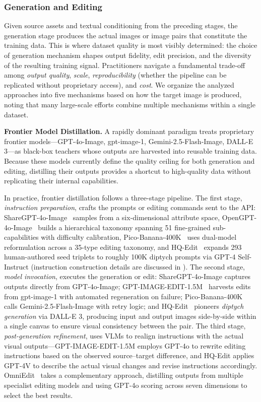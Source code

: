 \subsubsection{Generation and Editing}
\label{sec:generation}

Given source assets and textual conditioning from the preceding stages, the generation stage produces the actual images or image pairs that constitute the training data. This is where dataset quality is most visibly determined: the choice of generation mechanism shapes output fidelity, edit precision, and the diversity of the resulting training signal. Practitioners navigate a fundamental trade-off among \emph{output quality}, \emph{scale}, \emph{reproducibility} (whether the pipeline can be replicated without proprietary access), and \emph{cost}. We organize the analyzed approaches into five mechanisms based on how the target image is produced, noting that many large-scale efforts combine multiple mechanisms within a single dataset.


\textbf{Frontier Model Distillation.}
A rapidly dominant paradigm treats proprietary frontier models---GPT-4o-Image, gpt-image-1, Gemini-2.5-Flash-Image, DALL-E 3---as black-box teachers whose outputs are harvested into reusable training data. Because these models currently define the quality ceiling for both generation and editing, distilling their outputs provides a shortcut to high-quality data without replicating their internal capabilities.

In practice, frontier distillation follows a three-stage pipeline. The first stage, \emph{instruction preparation}, crafts the prompts or editing commands sent to the API: ShareGPT-4o-Image~\citep{chen2025sharegpt} samples from a six-dimensional attribute space, OpenGPT-4o-Image~\citep{chen2025opengpt} builds a hierarchical taxonomy spanning 51 fine-grained sub-capabilities with difficulty calibration, Pico-Banana-400K~\citep{qian2025pico} uses dual-model reformulation across a 35-type editing taxonomy, and HQ-Edit~\citep{hui2024hq} expands 293 human-authored seed triplets to roughly 100K diptych prompts via GPT-4 Self-Instruct (instruction construction details are discussed in ). The second stage, \emph{model invocation}, executes the generation or edit: ShareGPT-4o-Image captures outputs directly from GPT-4o-Image; GPT-IMAGE-EDIT-1.5M~\citep{wang2025gpt} harvests edits from gpt-image-1 with automated regeneration on failure; Pico-Banana-400K calls Gemini-2.5-Flash-Image with retry logic; and HQ-Edit~\citep{hui2024hq} pioneers \emph{diptych generation} via DALL-E 3, producing input and output images side-by-side within a single canvas to ensure visual consistency between the pair. The third stage, \emph{post-generation refinement}, uses VLMs to realign instructions with the actual visual outputs---GPT-IMAGE-EDIT-1.5M employs GPT-4o to rewrite editing instructions based on the observed source--target difference, and HQ-Edit applies GPT-4V to describe the actual visual changes and revise instructions accordingly. OmniEdit~\citep{wei2024omniedit} takes a complementary approach, distilling outputs from multiple specialist editing models and using GPT-4o scoring across seven dimensions to select the best results.

